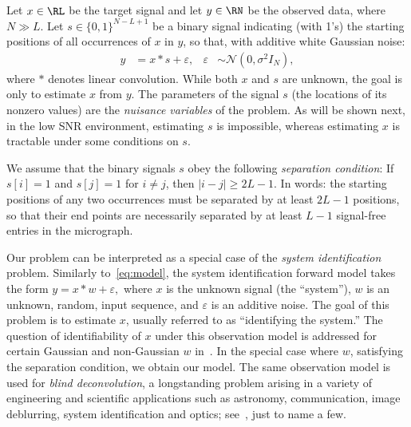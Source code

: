 \documentclass[9pt,twocolumn,twoside,lineno]{pnas-new}
\begin{document}
Let $x\in\RL$ be the target signal and let $y\in\RN$ be the observed data, where $N \gg L$. Let  $s \in \{0, 1\}^{N-L+1}$ be a binary signal indicating (with 1's) the starting positions of all occurrences of $x$ in $y$, so that, with additive white Gaussian noise:
\begin{align}
y & =  x \ast s + \varepsilon, & \varepsilon & \sim \mathcal{N}(0,\sigma^2 I_N),
\label{eq:model}
\end{align}
where $\ast$ denotes linear convolution. 
While both $x$ and $s$ are unknown, the goal is only to estimate $x$ from $y$. The parameters of the signal $s$ (the locations of its nonzero values) are the \emph{nuisance variables} of the problem. As will be shown next, in the low SNR environment, estimating $s$ is impossible, whereas estimating $x$ is tractable under some conditions on $s$. 

We assume that the binary signals $s$ obey the following \emph{separation condition}: If $s[i] = 1$ and $s[j] = 1$  for  $i \neq j$, then $\vert i - j\vert \geq 2L-1$.
In words: the starting positions of any two occurrences  must be separated by at least $2L-1$ positions, so that their end points are necessarily separated by at least $L-1$ signal-free entries in the micrograph.

Our problem can be interpreted as a special case of the \emph{system identification} problem. Similarly to~\eqref{eq:model}, the system identification forward model takes the form
%
\begin{math}
%
y = x\ast w + \varepsilon,  
%
\end{math} 
%
where $x$ is the unknown signal (the ``system''), $w$ is an unknown, random, input sequence, and $\varepsilon$ is an additive noise.   
The goal of this problem is to estimate $x$, usually referred to as ``identifying the system.'' The question of identifiability of $x$ under this observation model is addressed for certain Gaussian and non-Gaussian $w$ in~\cite{benveniste1980robust,kormylo1983identifiability}. In the special case where $w$, satisfying the separation condition, we obtain our model. The same observation model is used for \emph{blind deconvolution}, a longstanding problem arising in a variety of engineering and scientific applications such as astronomy, communication, image deblurring, system identification and optics; see~\cite{jefferies1993restoration,shalvi1990new,ayers1988iterative,abed1997blind}, just to name a few. 
\end{document}
